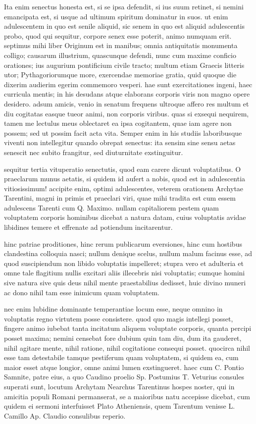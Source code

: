  Ita enim senectus honesta est, si se ipsa defendit, si ius suum retinet, si nemini emancipata est, si usque ad ultimum spiritum dominatur in suos. ut enim adulescentem in quo est senile aliquid, sic senem in quo est aliquid adulescentis probo, quod qui sequitur, corpore senex esse poterit, animo numquam erit. septimus mihi liber Originum est in manibus; omnia antiquitatis monumenta colligo; causarum illustrium, quascunque defendi, nunc cum maxime conficio orationes; ius augurium pontificium civile tracto; multum etiam Graecis litteris utor; Pythagoriorumque more, exercendae memoriae gratia, quid quoque die dixerim audierim egerim commemoro vesperi. hae sunt exercitationes ingeni, haec curricula mentis; in his desudans atque elaborans corporis viris non magno opere desidero. adsum amicis, venio in senatum frequens ultroque affero res multum et diu cogitatas easque tueor animi, non corporis viribus. quas si exsequi nequirem, tamen me lectulus meus oblectaret ea ipsa cogitantem, quae iam agere non possem; sed ut possim facit acta vita. Semper enim in his studiis laboribusque viventi non intellegitur quando obrepat senectus: ita sensim sine sensu aetas senescit nec subito frangitur, sed diuturnitate exstinguitur.

 sequitur tertia vituperatio senectutis, quod eam carere dicunt voluptatibus. O praeclarum munus aetatis, si quidem id aufert a nobis, quod est in adulescentia vitiosissimum! accipite enim, optimi adulescentes, veterem orationem Archytae Tarentini, magni in primis et praeclari viri, quae mihi tradita est cum essem adulescens Tarenti cum Q. Maximo. nullam capitaliorem pestem quam voluptatem corporis hominibus dicebat a natura datam, cuius voluptatis avidae libidines temere et effrenate ad potiendum incitarentur.

 hinc patriae proditiones, hinc rerum publicarum eversiones, hinc cum hostibus clandestina colloquia nasci; nullum denique scelus, nullum malum facinus esse, ad quod suscipiendum non libido voluptatis impelleret; stupra vero et adulteria et omne tale flagitium nullis excitari aliis illecebris nisi voluptatis; cumque homini sive natura sive quis deus nihil mente praestabilius dedisset, huic divino muneri ac dono nihil tam esse inimicum quam voluptatem.

 nec enim lubidine dominante temperantiae locum esse, neque omnino in voluptatis regno virtutem posse consistere. quod quo magis intellegi posset, fingere animo iubebat tanta incitatum aliquem voluptate corporis, quanta percipi posset maxima; nemini censebat fore dubium quin tam diu, dum ita gauderet, nihil agitare mente, nihil ratione, nihil cogitatione consequi posset. quocirca nihil esse tam detestabile tamque pestiferum quam voluptatem, si quidem ea, cum maior esset atque longior, omne animi lumen exstingueret. haec cum C. Pontio Samnite, patre eius, a quo Caudino proelio Sp. Postumius T. Veturius consules superati sunt, locutum Archytam Nearchus Tarentinus hospes noster, qui in amicitia populi Romani permanserat, se a maioribus natu accepisse dicebat, cum quidem ei sermoni interfuisset Plato Atheniensis, quem Tarentum venisse L. Camillo Ap. Claudio consulibus reperio.

